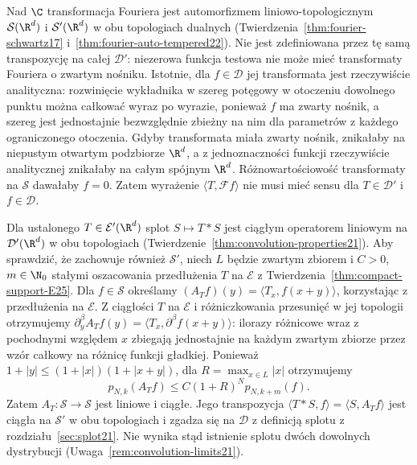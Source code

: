 \begin{uwaga}
\label{rem:fourier-conv25}
Nad $\C$ transformacja Fouriera jest automorfizmem
liniowo-topologicznym $\mathcal S(\R^d)$ i
$\mathcal S'(\R^d)$ w obu topologiach dualnych
(Twierdzenia~\ref{thm:fourier-schwartz17}
i~\ref{thm:fourier-auto-tempered22}).
Nie jest zdefiniowana przez tę samą transpozycję
na całej $\mathcal D'$: niezerowa funkcja testowa
nie może mieć transformaty Fouriera o zwartym nośniku.
Istotnie, dla $f\in\mathcal D$ jej transformata
jest rzeczywiście analityczna: rozwinięcie wykładnika
w szereg potęgowy w otoczeniu dowolnego punktu
można całkować wyraz po wyrazie, ponieważ $f$ ma
zwarty nośnik, a szereg jest jednostajnie bezwzględnie
zbieżny na nim dla parametrów z każdego ograniczonego
otoczenia. Gdyby transformata miała zwarty nośnik,
znikałaby na niepustym otwartym podzbiorze $\R^d$,
a z jednoznaczności funkcji rzeczywiście analitycznej
znikałaby na całym spójnym $\R^d$.
Różnowartościowość transformaty na $\mathcal S$
dawałaby $f=0$. Zatem wyrażenie
$\langle T,\mathcal F f\rangle$ nie musi mieć sensu
dla $T\in\mathcal D'$ i $f\in\mathcal D$.

Dla ustalonego $T\in\mathcal E'(\R^d)$ splot
$S\mapsto T*S$ jest ciągłym operatorem liniowym
na $\mathcal D'(\R^d)$ w obu topologiach
(Twierdzenie~\ref{thm:convolution-properties21}).
Aby sprawdzić, że zachowuje również $\mathcal S'$,
niech $L$ będzie zwartym zbiorem i $C>0$, $m\in\N_0$
stałymi oszacowania przedłużenia $T$ na $\mathcal E$
z Twierdzenia~\ref{thm:compact-support-E25}.
Dla $f\in\mathcal S$ określamy
$(A_Tf)(y)=\langle T_x,f(x+y)\rangle$,
korzystając z przedłużenia na $\mathcal E$.
Z ciągłości $T$ na $\mathcal E$ i różniczkowania
przesunięć w jej topologii otrzymujemy
$\partial_y^\beta A_T f(y)=
\langle T_x,\partial^\beta f(x+y)\rangle$:
ilorazy różnicowe wraz z pochodnymi względem $x$
zbiegają jednostajnie na każdym zwartym zbiorze
przez wzór całkowy na różnicę funkcji gładkiej.
Ponieważ $1+|y|\le(1+|x|)(1+|x+y|)$, dla
$R=\max_{x\in L}|x|$ otrzymujemy
\[
 p_{N,k}(A_Tf)\le C(1+R)^N p_{N,k+m}(f).
\]
Zatem $A_T:\mathcal S\to\mathcal S$ jest liniowe
i ciągłe. Jego transpozycja
$\langle T*S,f\rangle=\langle S,A_Tf\rangle$
jest ciągła na $\mathcal S'$ w obu topologiach
i zgadza się na $\mathcal D$ z definicją splotu
z rozdziału~\ref{sec:splot21}.
Nie wynika stąd istnienie splotu dwóch dowolnych
dystrybucji (Uwaga~\ref{rem:convolution-limits21}).
\end{uwaga}
